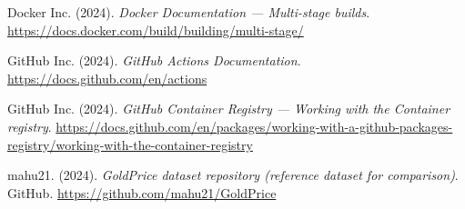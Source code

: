 \begin{enumerate}[label={[\arabic*]}, leftmargin=1.5cm]
  \item \label{ref:docker}
  Docker Inc. (2024).
  \textit{Docker Documentation --- Multi-stage builds}.
  \url{https://docs.docker.com/build/building/multi-stage/}

  \item \label{ref:ghactions}
  GitHub Inc. (2024).
  \textit{GitHub Actions Documentation}.
  \url{https://docs.github.com/en/actions}

  \item \label{ref:ghcr}
  GitHub Inc. (2024).
  \textit{GitHub Container Registry --- Working with the Container registry}.
  \url{https://docs.github.com/en/packages/working-with-a-github-packages-registry/working-with-the-container-registry}

  \item \label{ref:dataset}
  mahu21. (2024).
  \textit{GoldPrice dataset repository (reference dataset for comparison)}.
  GitHub.
  \url{https://github.com/mahu21/GoldPrice}

\end{enumerate}

\newpage
